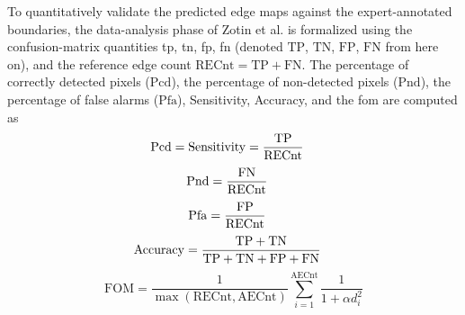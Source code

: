 To quantitatively validate the predicted edge maps against the expert-annotated boundaries, the data-analysis phase of Zotin et al. \cite{zotin2018edge} is formalized using the confusion-matrix quantities \gls{tp}, \gls{tn}, \gls{fp}, \gls{fn} (denoted $\mathrm{TP}$, $\mathrm{TN}$, $\mathrm{FP}$, $\mathrm{FN}$ from here on), and the reference edge count $\mathrm{RECnt}=\mathrm{TP}+\mathrm{FN}$. The percentage of correctly detected pixels ($\mathrm{Pcd}$), the percentage of non-detected pixels ($\mathrm{Pnd}$), the percentage of false alarms ($\mathrm{Pfa}$), Sensitivity, Accuracy, and the \gls{fom} \cite{pratt1979quantitative} are computed as
\begin{equation}
\mathrm{Pcd} = \mathrm{Sensitivity} = \frac{\mathrm{TP}}{\mathrm{RECnt}}\\[0.5em] \quad
\end{equation}
\begin{equation}
	\mathrm{Pnd} = \frac{\mathrm{FN}}{\mathrm{RECnt}}\\[0.5em] \quad
\end{equation}
\begin{equation}
	\mathrm{Pfa} = \frac{\mathrm{FP}}{\mathrm{RECnt}}\\[0.5em] \quad
\end{equation}
\begin{equation}
	\mathrm{Accuracy} = \frac{\mathrm{TP}+\mathrm{TN}}{\mathrm{TP}+\mathrm{TN}+\mathrm{FP}+\mathrm{FN}}
	\\[0.5em] \quad
\end{equation}
\begin{equation}
	\mathrm{FOM} = \frac{1}{\max(\mathrm{RECnt},\mathrm{AECnt})}\sum_{i=1}^{\mathrm{AECnt}} \frac{1}{1+\alpha d_i^2}
\end{equation}


